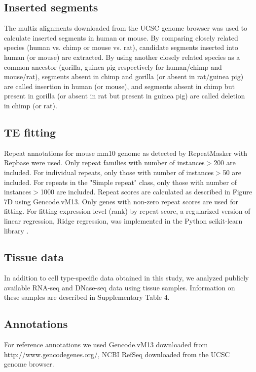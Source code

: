 \subsection{Inserted segments}
The multiz alignments downloaded from the UCSC genome browser \citep{Kent_2002} was used to calculate inserted segments in human or mouse. By comparing closely related species (human vs. chimp or mouse vs. rat), candidate segments inserted into human (or mouse) are extracted. By using another closely related species as a common ancestor (gorilla, guinea pig respectively for human/chimp and mouse/rat), segments absent in chimp and gorilla (or absent in rat/guinea pig) are called insertion in human (or mouse), and segments absent in chimp but present in gorilla (or absent in rat but present in guinea pig) are called deletion in chimp (or rat). 

\subsection{TE fitting}
Repeat annotations for mouse mm10 genome as detected by RepeatMasker \citep{repeatmasker} with Repbase \citep[ver. 20140131][]{Bao_2015} were used. Only repeat families with number of instances$>$200 are included. For individual repeats, only those with number of instances$>$50 are included. For repeats in the "Simple repeat" class, only those with number of instances$>$1000 are included. Repeat scores are calculated as described in Figure 7D using Gencode.vM13. Only genes with non-zero repeat scores are used for fitting. For fitting expression level (rank) by repeat score, a regularized version of linear regression, Ridge regression, was implemented in the Python scikit-learn library \citep{scikit-learn}.

\subsection{Tissue data}
In addition to cell type-specific data obtained in this study, we analyzed publicly available RNA-seq and DNase-seq data using tissue samples. Information on these samples are described in Supplementary Table 4.

\subsection{Annotations}
For reference annotations we used Gencode.vM13 \citep{Harrow_2012} downloaded from http://www.gencodegenes.org/, NCBI RefSeq \citep{Pruitt_2013} downloaded from the UCSC genome browser.

